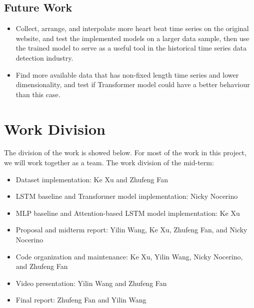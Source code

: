 \documentclass{article}
\begin{document}
\subsection{Future Work}
\begin{itemize}
    \item Collect, arrange, and interpolate more heart beat time series on the original website, and test the implemented models on a larger data sample, then use the trained model to serve as a useful tool in the historical time series data detection industry.
    
    \item Find more available data that has non-fixed length time series and lower dimensionality, and test if Transformer model could have a better behaviour than this case. 
\end{itemize}





\section{Work Division}
The division of the work is showed below. For most of the work in this project, we will work together as a team.
The work division of the mid-term:
\begin{itemize}
    \item Dataset implementation: Ke Xu and Zhufeng Fan
    \item LSTM baseline and Transformer model implementation: Nicky Nocerino
    \item MLP baseline and Attention-based LSTM model implementation: Ke Xu
    \item Proposal and midterm report: Yilin Wang, Ke Xu, Zhufeng Fan, and Nicky Nocerino
    \item Code organization and maintenance: Ke Xu, Yilin Wang, Nicky Nocerino, and Zhufeng Fan
    \item Video presentation: Yilin Wang and Zhufeng Fan
    \item Final report: Zhufeng Fan and Yilin Wang
\end{itemize}


{


}
\end{document}

